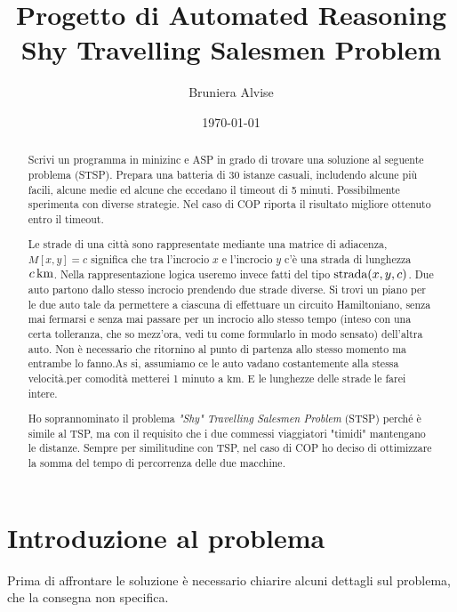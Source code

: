 \documentclass[12pt, a4paper]{article}
\title{Progetto di Automated Reasoning\\Shy Travelling Salesmen Problem}
\author{Bruniera Alvise}
\affil{Università degli studi di Udine}
\date{\today}
\begin{document}
\maketitle

\newpage

\begin{abstract}
    Scrivi un programma in minizinc e ASP in grado di trovare una soluzione al seguente problema (STSP). Prepara una batteria di 30 istanze casuali, includendo alcune più facili, alcune medie ed alcune che eccedano il timeout di 5 minuti.
    Possibilmente sperimenta con diverse strategie. Nel caso di COP riporta il risultato migliore ottenuto entro il timeout.

    Le strade di una città sono rappresentate mediante una matrice di adiacenza, $M[x,y]=c$ significa che tra l'incrocio $x$ e l'incrocio $y$ c'è una strada di lunghezza $\qty[parse-numbers = false]{c}{\kilo\meter}$. Nella rappresentazione logica useremo invece fatti del tipo $\text{\lstinline{strada}}(x,y,c)$. Due auto partono dallo stesso incrocio prendendo due strade diverse. Si trovi un piano per le due auto tale da permettere a ciascuna di effettuare un circuito Hamiltoniano, senza mai fermarsi e senza mai passare per un incrocio allo stesso tempo (inteso con una certa tolleranza, che so mezz'ora, vedi tu come formularlo in modo sensato) dell'altra auto. Non è necessario che ritornino al punto di partenza allo stesso momento ma entrambe lo fanno.As si, assumiamo ce le auto vadano costantemente alla stessa velocità.per comodità metterei 1 minuto a $\unit{\kilo\meter}$. E le lunghezze delle strade le farei intere.

    Ho soprannominato il problema \emph{"Shy" Travelling Salesmen Problem} (STSP) perché è simile al TSP, ma con il requisito che i due commessi viaggiatori "timidi" mantengano le distanze.
    Sempre per similitudine con TSP, nel caso di COP ho deciso di ottimizzare la somma del tempo di percorrenza delle due macchine.
\end{abstract}

\newpage

\tableofcontents

\newpage

\section{Introduzione al problema}

Prima di affrontare le soluzione è necessario chiarire alcuni dettagli sul problema, che la consegna non specifica.
\end{document}
